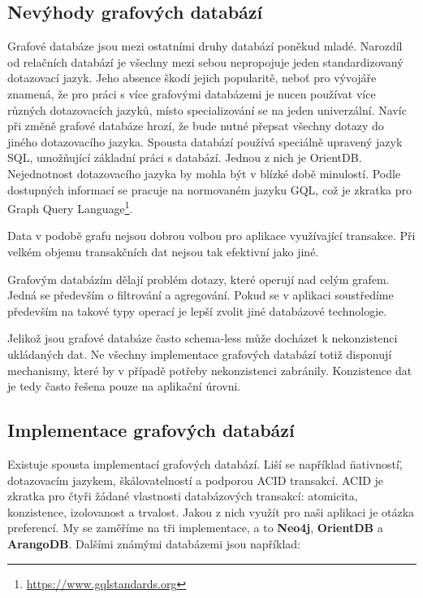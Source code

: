 \documentclass[
  program=infoi,
  biblatex=true,
  sourcecodes=true,
  figures=true,
  glossaries=false,
  index
]{kidiplom}
\begin{document}
\subsection{Nevýhody grafových databází}
Grafové databáze jsou mezi ostatními druhy databází poněkud mladé. Narozdíl od relačních databází je všechny mezi sebou nepropojuje jeden standardizovaný dotazovací jazyk. Jeho absence škodí jejich popularitě, neboť pro vývojáře znamená, že pro práci s více grafovými databázemi je nucen používat více různých dotazovacích jazyků, místo specializování se na jeden univerzální. Navíc při změně grafové databáze hrozí, že bude nutné přepsat všechny dotazy do jiného dotazovacího jazyka. Spousta databází používá speciálně upravený jazyk SQL, umožňující základní práci s databází. Jednou z nich je OrientDB. Nejednotnost dotazovacího jazyka by mohla být v blízké době minulostí. Podle dostupných informací se pracuje na normovaném jazyku GQL, což je zkratka pro Graph Query Language\footnote{\url{https://www.gqlstandards.org}}.

Data v podobě grafu nejsou dobrou volbou pro aplikace využívající transakce. Při velkém objemu transakčních dat nejsou tak efektivní jako jiné.

Grafovým databázím dělají problém dotazy, které operují nad celým grafem. Jedná se především o filtrování a agregování. Pokud se v aplikaci soustředíme především na takové typy operací je lepší zvolit jiné databázové technologie.

Jelikož jsou grafové databáze často schema-less může docházet k nekonzistenci ukládaných dat. Ne všechny implementace grafových databází totiž disponují mechanismy, které by v případě potřeby nekonzistenci zabránily. Konzistence dat je tedy často řešena pouze na aplikační úrovni.

\subsection{Implementace grafových databází}
Existuje spousta implementací grafových databází. Liší se například \"nativností\", dotazovacím jazykem, škálovatelností a podporou ACID transakcí. ACID je zkratka pro čtyři žádané vlastnosti databázových transakcí: atomicita, konzistence, izolovanost a trvalost. Jakou z nich využít pro naši aplikaci je otázka preferencí. My se zaměříme na tři implementace, a to \textbf{Neo4j}, \textbf{OrientDB} a \textbf{ArangoDB}. Dalšími známými databázemi jsou například:
\end{document}
